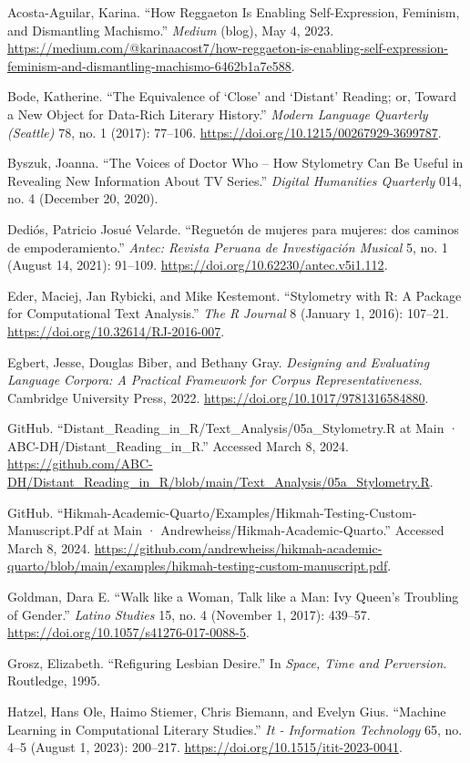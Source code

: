 \documentclass[
  letterpaper,
  DIV=11,
  numbers=noendperiod]{scrartcl}
\begin{document}
Acosta-Aguilar, Karina. ``How Reggaeton Is Enabling Self-Expression,
Feminism, and Dismantling Machismo.'' \emph{Medium} (blog), May 4, 2023.
\url{https://medium.com/@karinaacost7/how-reggaeton-is-enabling-self-expression-feminism-and-dismantling-machismo-6462b1a7e588}.

Bode, Katherine. ``The Equivalence of `Close' and `Distant' Reading; or,
Toward a New Object for Data-Rich Literary History.'' \emph{Modern
Language Quarterly (Seattle)} 78, no. 1 (2017): 77--106.
\url{https://doi.org/10.1215/00267929-3699787}.

Byszuk, Joanna. ``The Voices of Doctor Who -- How Stylometry Can Be
Useful in Revealing New Information About TV Series.'' \emph{Digital
Humanities Quarterly} 014, no. 4 (December 20, 2020).

Dediós, Patricio Josué Velarde. ``Reguetón de mujeres para mujeres: dos
caminos de empoderamiento.'' \emph{Antec: Revista Peruana de
Investigación Musical} 5, no. 1 (August 14, 2021): 91--109.
\url{https://doi.org/10.62230/antec.v5i1.112}.

Eder, Maciej, Jan Rybicki, and Mike Kestemont. ``Stylometry with R: A
Package for Computational Text Analysis.'' \emph{The R Journal} 8
(January 1, 2016): 107--21. \url{https://doi.org/10.32614/RJ-2016-007}.

Egbert, Jesse, Douglas Biber, and Bethany Gray. \emph{Designing and
Evaluating Language Corpora: A Practical Framework for Corpus
Representativeness}. Cambridge University Press, 2022.
\url{https://doi.org/10.1017/9781316584880}.

GitHub. ``Distant\_Reading\_in\_R/Text\_Analysis/05a\_Stylometry.R at
Main · ABC-DH/Distant\_Reading\_in\_R.'' Accessed March 8, 2024.
\url{https://github.com/ABC-DH/Distant_Reading_in_R/blob/main/Text_Analysis/05a_Stylometry.R}.

GitHub.
``Hikmah-Academic-Quarto/Examples/Hikmah-Testing-Custom-Manuscript.Pdf
at Main · Andrewheiss/Hikmah-Academic-Quarto.'' Accessed March 8, 2024.
\url{https://github.com/andrewheiss/hikmah-academic-quarto/blob/main/examples/hikmah-testing-custom-manuscript.pdf}.

Goldman, Dara E. ``Walk like a Woman, Talk like a Man: Ivy Queen's
Troubling of Gender.'' \emph{Latino Studies} 15, no. 4 (November 1,
2017): 439--57. \url{https://doi.org/10.1057/s41276-017-0088-5}.

Grosz, Elizabeth. ``Refiguring Lesbian Desire.'' In \emph{Space, Time
and Perversion}. Routledge, 1995.

Hatzel, Hans Ole, Haimo Stiemer, Chris Biemann, and Evelyn Gius.
``Machine Learning in Computational Literary Studies.'' \emph{It -
Information Technology} 65, no. 4--5 (August 1, 2023): 200--217.
\url{https://doi.org/10.1515/itit-2023-0041}.
\end{document}
